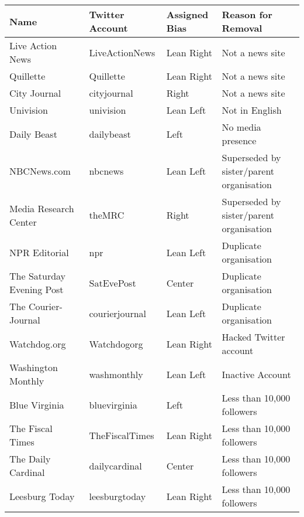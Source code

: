 \begin{tabular}{llll}
\toprule
                      Name &  Twitter Account & Assigned Bias &                        Reason for Removal \\
\midrule
          Live Action News &   LiveActionNews &    Lean Right &                           Not a news site \\
                 Quillette &        Quillette &    Lean Right &                           Not a news site \\
              City Journal &      cityjournal &         Right &                           Not a news site \\
                 Univision &        univision &     Lean Left &                            Not in English \\
               Daily Beast &       dailybeast &          Left &                         No media presence \\
               NBCNews.com &          nbcnews &     Lean Left &  Superseded by sister/parent organisation \\
     Media Research Center &           theMRC &         Right &  Superseded by sister/parent organisation \\
             NPR Editorial &              npr &     Lean Left &                    Duplicate organisation \\
 The Saturday Evening Post &       SatEvePost &        Center &                    Duplicate organisation \\
       The Courier-Journal &   courierjournal &     Lean Left &                    Duplicate organisation \\
              Watchdog.org &      Watchdogorg &    Lean Right &                    Hacked Twitter account \\
        Washington Monthly &      washmonthly &     Lean Left &                          Inactive Account \\
             Blue Virginia &     bluevirginia &          Left &                Less than 10,000 followers \\
          The Fiscal Times &   TheFiscalTimes &    Lean Right &                Less than 10,000 followers \\
        The Daily Cardinal &    dailycardinal &        Center &                Less than 10,000 followers \\
            Leesburg Today &    leesburgtoday &    Lean Right &                Less than 10,000 followers \\

\end{tabular}
